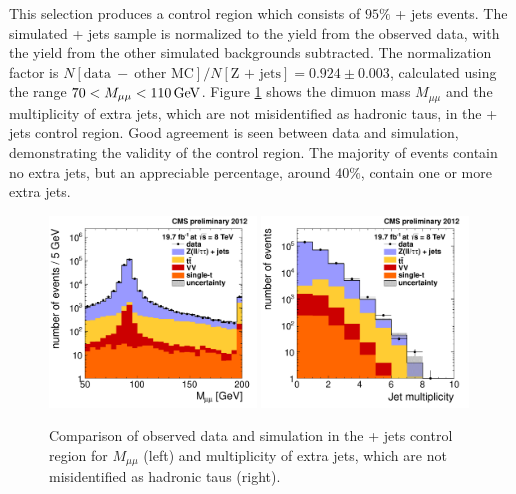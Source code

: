 This selection produces a control region which consists of $95\%$ \Z + jets events. The simulated \Z + jets sample is normalized to the yield from the observed data, with the yield from the other simulated backgrounds subtracted. The normalization factor is $N[\text{data}~-~\text{other MC}]/N[\text{Z + jets}] = 0.924 \pm 0.003$, calculated using the range $70 < M_{\mu\mu} < 110\,\text{Ge\hspace{-.08em}V}$. Figure \ref{Bkg:fig:Zregion} shows the dimuon mass $M_{\mu\mu}$ and the multiplicity of extra jets, which are not misidentified as hadronic taus, in the \Zmm + jets control region. Good agreement is seen between data and simulation, demonstrating the validity of the control region. The majority of events contain no extra jets, but an appreciable percentage, around $40\%$, contain one or more extra jets.

\begin{figure}[hbt]
  \begin{center}
    \includegraphics[width=0.49\textwidth]{figures/bkgEstim/massdimuon.pdf}
    \includegraphics[width=0.49\textwidth]{figures/bkgEstim/njet.pdf}
    \caption{Comparison of observed data and simulation in the \Zmm + jets control region for $M_{\mu\mu}$ (left) and multiplicity of extra jets, which are not misidentified as hadronic taus (right). \label{Bkg:fig:Zregion}}
  \end{center}
\end{figure}

